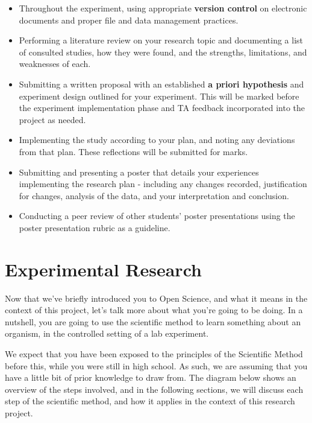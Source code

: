 \documentclass[
]{book}
\providecommand{\tightlist}{%
  \setlength{\itemsep}{0pt}\setlength{\parskip}{0pt}}
\begin{document}
\begin{itemize}
\tightlist
\item
  Throughout the experiment, using appropriate \textbf{version control} on electronic documents and proper file and data management practices.
\item
  Performing a literature review on your research topic and documenting a list of consulted studies, how they were found, and the strengths, limitations, and weaknesses of each.
\item
  Submitting a written proposal with an established \textbf{a priori hypothesis} and experiment design outlined for your experiment. This will be marked before the experiment implementation phase and TA feedback incorporated into the project as needed.
\item
  Implementing the study according to your plan, and noting any deviations from that plan. These reflections will be submitted for marks.
\item
  Submitting and presenting a poster that details your experiences implementing the research plan - including any changes recorded, justification for changes, analysis of the data, and your interpretation and conclusion.
\item
  Conducting a peer review of other students' poster presentations using the poster presentation rubric as a guideline.
\end{itemize}

\hypertarget{experimental-research}{%
\section*{Experimental Research}\label{experimental-research}}

Now that we've briefly introduced you to Open Science, and what it means in the context of this project, let's talk more about what you're going to be doing. In a nutshell, you are going to use the scientific method to learn something about an organism, in the controlled setting of a lab experiment.

We expect that you have been exposed to the principles of the Scientific Method before this, while you were still in high school. As such, we are assuming that you have a little bit of prior knowledge to draw from. The diagram below shows an overview of the steps involved, and in the following sections, we will discuss each step of the scientific method, and how it applies in the context of this research project.
\end{document}
